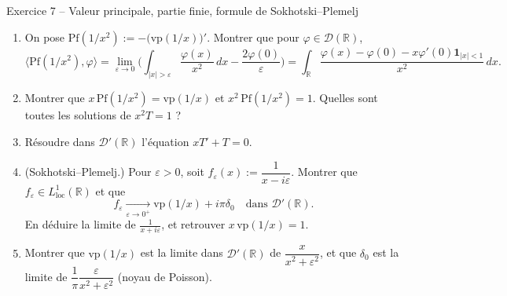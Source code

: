 \documentclass[11pt,a4paper]{article}
\newcommand{\R}{\mathbb{R}}
\newcommand{\D}{\mathcal{D}}
\theoremstyle{definition}
\begin{document}
\begin{exo}{Exercice 7 -- Valeur principale, partie finie, formule de Sokhotski--Plemelj}
\begin{enumerate}[label=(\alph*)]
  \item On pose $\mathrm{Pf}(1/x^2):=-\big(\mathrm{vp}(1/x)\big)'$. Montrer que pour $\varphi\in\D(\R)$,
  \[
  \big\langle\mathrm{Pf}(1/x^2),\varphi\big\rangle=\lim_{\varepsilon\to0}\Big(\int_{|x|>\varepsilon}\frac{\varphi(x)}{x^2}\,dx-\frac{2\varphi(0)}\varepsilon\Big)=\int_\R\frac{\varphi(x)-\varphi(0)-x\varphi'(0)\mathbf 1_{|x|<1}}{x^2}\,dx .
  \]
  \item Montrer que $x\,\mathrm{Pf}(1/x^2)=\mathrm{vp}(1/x)$ et $x^2\,\mathrm{Pf}(1/x^2)=1$. Quelles sont toutes les solutions de $x^2T=1$ ?
  \item Résoudre dans $\D'(\R)$ l'équation $xT'+T=0$.
  \item (Sokhotski--Plemelj.) Pour $\varepsilon>0$, soit $f_\varepsilon(x):=\dfrac1{x-i\varepsilon}$. Montrer que $f_\varepsilon\in L^1_{\mathrm{loc}}(\R)$ et que
  \[
  f_\varepsilon\xrightarrow[\varepsilon\to0^+]{}\mathrm{vp}(1/x)+i\pi\delta_0\quad\text{dans }\D'(\R).
  \]
  En déduire la limite de $\frac1{x+i\varepsilon}$, et retrouver $x\,\mathrm{vp}(1/x)=1$.
  \item Montrer que $\mathrm{vp}(1/x)$ est la limite dans $\D'(\R)$ de $\dfrac{x}{x^2+\varepsilon^2}$, et que $\delta_0$ est la limite de $\dfrac1\pi\dfrac{\varepsilon}{x^2+\varepsilon^2}$ (noyau de Poisson).
\end{enumerate}
\end{exo}
\end{document}
